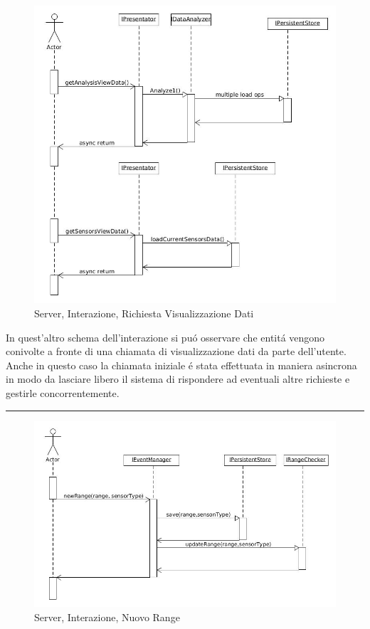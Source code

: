 \begin{figure}[H]
\centering
\includegraphics[width=\textwidth]{Figures/DomainModel/Server/GetOperationInteraction.jpg}
\caption{Server, Interazione, Richiesta Visualizzazione Dati}
\end{figure}

In quest'altro schema dell'interazione si pu\'o osservare che entit\'a vengono conivolte a fronte di una chiamata di visualizzazione dati da parte dell'utente. Anche in questo caso la chiamata iniziale \'e stata effettuata in maniera asincrona in modo da lasciare libero il sistema di rispondere ad eventuali altre richieste e gestirle concorrentemente.

\noindent\rule[0.5ex]{\linewidth}{1pt}

\begin{figure}[H]
\centering
\includegraphics[width=\textwidth]{Figures/DomainModel/Server/NewRangeInteraction.jpg}
\caption{Server, Interazione, Nuovo Range}
\end{figure}

